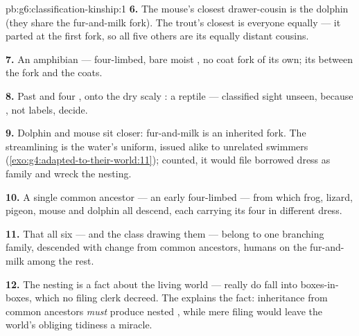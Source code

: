 \begin{solution}{pb:g6:classification-kinship:1}
\textbf{6.} The mouse's closest drawer-cousin is the
dolphin (they share the fur-and-milk fork). The trout's
closest is everyone equally --- it parted at the first
fork, so all five others are its equally distant cousins.

\textbf{7.} An amphibian --- four-limbed, bare moist ,
no coat fork of its own; its   between the
 fork and the coats.

\textbf{8.} Past  and four , onto the dry
scaly : a reptile --- classified sight unseen,
because , not labels, decide.

\textbf{9.} Dolphin and mouse sit closer: fur-and-milk is
an inherited fork. The streamlining is the water's uniform,
issued alike to unrelated swimmers
(\cref{exo:g4:adapted-to-their-world:11}); counted, it
would file borrowed dress as family and wreck the nesting.

\textbf{10.} A single common ancestor  --- an early
four-limbed  --- from which frog, lizard, pigeon,
mouse and dolphin all descend, each carrying its four
 in different dress.

\textbf{11.} That all six --- and the class drawing them
--- belong to one branching family, descended with change
from common ancestors, humans on the fur-and-milk 
among the rest.

\textbf{12.} The nesting is a fact about the living world
---  really do fall into boxes-in-boxes, which
no filing clerk decreed. The  explains the fact:
inheritance from common ancestors \emph{must} produce
nested , while mere filing would leave the
world's obliging tidiness a miracle.
\end{solution}
